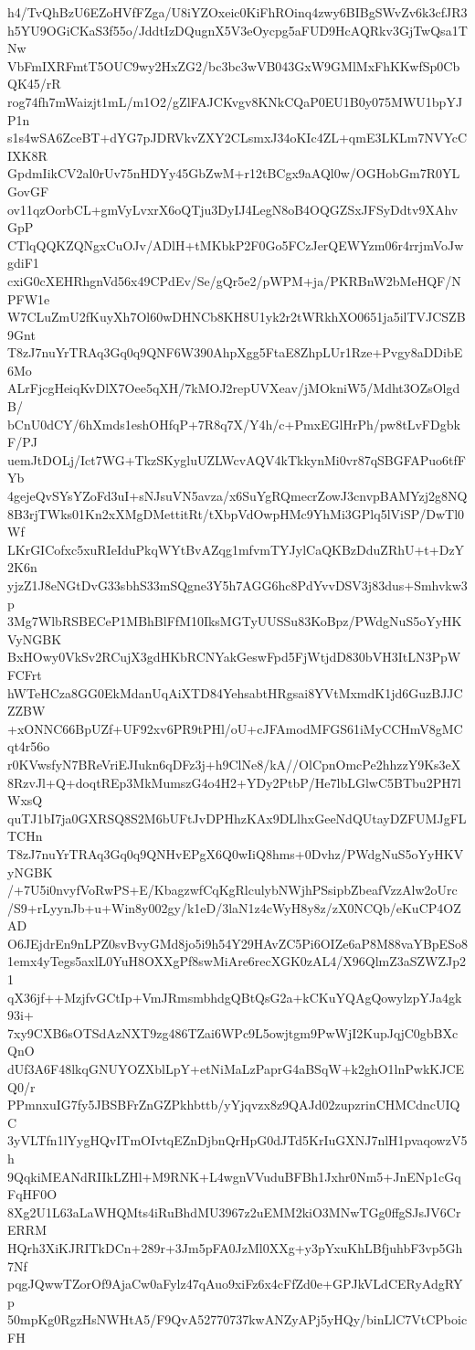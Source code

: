 h4/TvQhBzU6EZoHVfFZga/U8iYZOxeic0KiFhROinq4zwy6BIBgSWvZv6k3cfJR3
h5YU9OGiCKaS3f55o/JddtIzDQugnX5V3eOycpg5aFUD9HcAQRkv3GjTwQsa1TNw
VbFmIXRFmtT5OUC9wy2HxZG2/bc3bc3wVB043GxW9GMlMxFhKKwfSp0CbQK45/rR
rog74fh7mWaizjt1mL/m1O2/gZlFAJCKvgv8KNkCQaP0EU1B0y075MWU1bpYJP1n
s1s4wSA6ZceBT+dYG7pJDRVkvZXY2CLsmxJ34oKIc4ZL+qmE3LKLm7NVYcCIXK8R
GpdmIikCV2al0rUv75nHDYy45GbZwM+r12tBCgx9aAQl0w/OGHobGm7R0YLGovGF
ov11qzOorbCL+gmVyLvxrX6oQTju3DyIJ4LegN8oB4OQGZSxJFSyDdtv9XAhvGpP
CTlqQQKZQNgxCuOJv/ADlH+tMKbkP2F0Go5FCzJerQEWYzm06r4rrjmVoJwgdiF1
cxiG0cXEHRhgnVd56x49CPdEv/Se/gQr5e2/pWPM+ja/PKRBnW2bMeHQF/NPFW1e
W7CLuZmU2fKuyXh7Ol60wDHNCb8KH8U1yk2r2tWRkhXO0651ja5ilTVJCSZB9Gnt
T8zJ7nuYrTRAq3Gq0q9QNF6W390AhpXgg5FtaE8ZhpLUr1Rze+Pvgy8aDDibE6Mo
ALrFjcgHeiqKvDlX7Oee5qXH/7kMOJ2repUVXeav/jMOkniW5/Mdht3OZsOlgdB/
bCnU0dCY/6hXmds1eshOHfqP+7R8q7X/Y4h/c+PmxEGlHrPh/pw8tLvFDgbkF/PJ
uemJtDOLj/Ict7WG+TkzSKygluUZLWcvAQV4kTkkynMi0vr87qSBGFAPuo6tfFYb
4gejeQvSYsYZoFd3uI+sNJsuVN5avza/x6SuYgRQmecrZowJ3cnvpBAMYzj2g8NQ
8B3rjTWks01Kn2xXMgDMettitRt/tXbpVdOwpHMc9YhMi3GPlq5lViSP/DwTl0Wf
LKrGICofxc5xuRIeIduPkqWYtBvAZqg1mfvmTYJylCaQKBzDduZRhU+t+DzY2K6n
yjzZ1J8eNGtDvG33sbhS33mSQgne3Y5h7AGG6hc8PdYvvDSV3j83dus+Smhvkw3p
3Mg7WlbRSBECeP1MBhBlFfM10IksMGTyUUSSu83KoBpz/PWdgNuS5oYyHKVyNGBK
BxHOwy0VkSv2RCujX3gdHKbRCNYakGeswFpd5FjWtjdD830bVH3ItLN3PpWFCFrt
hWTeHCza8GG0EkMdanUqAiXTD84YehsabtHRgsai8YVtMxmdK1jd6GuzBJJCZZBW
+xONNC66BpUZf+UF92xv6PR9tPHl/oU+cJFAmodMFGS61iMyCCHmV8gMCqt4r56o
r0KVwsfyN7BReVriEJIukn6qDFz3j+h9ClNe8/kA//OlCpnOmcPe2hhzzY9Ks3eX
8RzvJl+Q+doqtREp3MkMumszG4o4H2+YDy2PtbP/He7lbLGlwC5BTbu2PH7lWxsQ
quTJ1bI7ja0GXRSQ8S2M6bUFtJvDPHhzKAx9DLlhxGeeNdQUtayDZFUMJgFLTCHn
T8zJ7nuYrTRAq3Gq0q9QNHvEPgX6Q0wIiQ8hms+0Dvhz/PWdgNuS5oYyHKVyNGBK
/+7U5i0nvyfVoRwPS+E/KbagzwfCqKgRlculybNWjhPSsipbZbeafVzzAlw2oUrc
/S9+rLyynJb+u+Win8y002gy/k1eD/3laN1z4cWyH8y8z/zX0NCQb/eKuCP4OZAD
O6JEjdrEn9nLPZ0svBvyGMd8jo5i9h54Y29HAvZC5Pi6OIZe6aP8M88vaYBpESo8
1emx4yTegs5axlL0YuH8OXXgPf8swMiAre6recXGK0zAL4/X96QlmZ3aSZWZJp21
qX36jf++MzjfvGCtIp+VmJRmsmbhdgQBtQsG2a+kCKuYQAgQowylzpYJa4gk93i+
7xy9CXB6sOTSdAzNXT9zg486TZai6WPc9L5owjtgm9PwWjI2KupJqjC0gbBXcQnO
dUf3A6F48lkqGNUYOZXblLpY+etNiMaLzPaprG4aBSqW+k2ghO1lnPwkKJCEQ0/r
PPmnxuIG7fy5JBSBFrZnGZPkhbttb/yYjqvzx8z9QAJd02zupzrinCHMCdncUIQC
3yVLTfn1lYygHQvITmOIvtqEZnDjbnQrHpG0dJTd5KrIuGXNJ7nlH1pvaqowzV5h
9QqkiMEANdRIIkLZHl+M9RNK+L4wgnVVuduBFBh1Jxhr0Nm5+JnENp1cGqFqHF0O
8Xg2U1L63aLaWHQMts4iRuBhdMU3967z2uEMM2kiO3MNwTGg0ffgSJsJV6CrERRM
HQrh3XiKJRITkDCn+289r+3Jm5pFA0JzMl0XXg+y3pYxuKhLBfjuhbF3vp5Gh7Nf
pqgJQwwTZorOf9AjaCw0aFylz47qAuo9xiFz6x4cFfZd0e+GPJkVLdCERyAdgRYp
50mpKg0RgzHsNWHtA5/F9QvA52770737kwANZyAPj5yHQy/binLlC7VtCPboicFH
